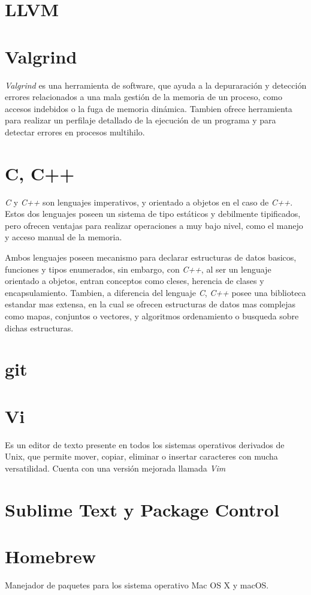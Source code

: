 \section{LLVM}




\section{Valgrind}
\textit{Valgrind} es una herramienta de software, que ayuda a la depuraración y
detección errores relacionados a una mala gestión de la memoria de un
proceso, como accesos indebidos o la fuga de memoria dinámica. Tambien ofrece
herramienta para realizar un perfilaje detallado de la ejecución de un
programa y para detectar errores en procesos multihilo.

\section{C, C++}
\textit{C} y \textit{C++} son lenguajes imperativos, y orientado a objetos en
el caso de \textit{C++}. Estos dos lenguajes poseen un sistema de tipo
estáticos y debilmente tipificados, pero ofrecen ventajas para realizar
operaciones a muy bajo nivel, como el manejo y acceso manual de la memoria.

Ambos lenguajes poseen mecanismo para declarar estructuras de datos basicos,
funciones y tipos enumerados, sin embargo, con \textit{C++}, al ser un
lenguaje orientado a objetos, entran conceptos como cleses, herencia de clases
y encapsulamiento. Tambien, a diferencia del lenguaje \textit{C}, \textit{C++}
posee una biblioteca estandar mas extensa, en la cual se ofrecen estructuras
de datos mas complejas como mapas, conjuntos o vectores, y algoritmos
ordenamiento o busqueda sobre dichas estructuras.

\section{git}


\section{Vi}
Es un editor de texto presente en todos los sistemas operativos derivados de Unix,
que  permite mover, copiar, eliminar o insertar caracteres con mucha
versatilidad. Cuenta con una versión mejorada llamada \textit{Vim}

\section{Sublime Text y Package Control}

\section{Homebrew}
Manejador de paquetes para los sistema operativo Mac OS X y macOS.
